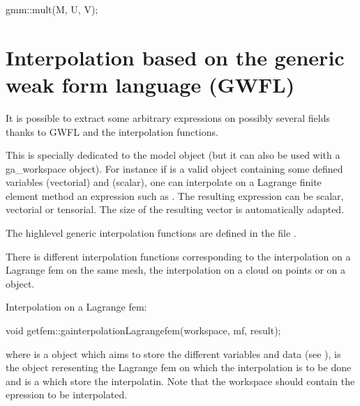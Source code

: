 \documentclass[a4paper,11pt,english]{sphinxmanual}
\begin{document}
\begin{sphinxVerbatim}[commandchars=\\\{\}]
gmm::mult(M, U, V);
\end{sphinxVerbatim}


\section{Interpolation based on the generic weak form language (GWFL)}
\label{\detokenize{userdoc/interMM:interpolation-based-on-the-generic-weak-form-language-gwfl}}
It is possible to extract some arbitrary expressions on possibly several fields thanks to GWFL and the interpolation functions.

This is specially dedicated to the model object (but it can also be used with a ga\_workspace object). For instance if  is a valid object containing some defined variables  (vectorial) and  (scalar), one can interpolate on a Lagrange finite element method an expression such as . The resulting expression can be scalar, vectorial or tensorial. The size of the resulting vector is automatically adapted.

The high\sphinxhyphen{}level generic interpolation functions are defined in the file .

There is different interpolation functions corresponding to the interpolation on a Lagrange fem on the same mesh, the interpolation on a cloud on points or on a  object.

Interpolation on a Lagrange fem:

\begin{sphinxVerbatim}[commandchars=\\\{\}]
void getfem::ga\PYGZus{}interpolation\PYGZus{}Lagrange\PYGZus{}fem(workspace, mf, result);
\end{sphinxVerbatim}

where  is a  object which aims to store the different variables and data (see  {\hyperref[\detokenize{userdoc/gasm_high:ud-gasm-high}]{}}),  is the  object reresenting the Lagrange fem on which the interpolation is to be done and  is a  which store the interpolatin. Note that the workspace should contain the epression to be interpolated.
\end{document}
